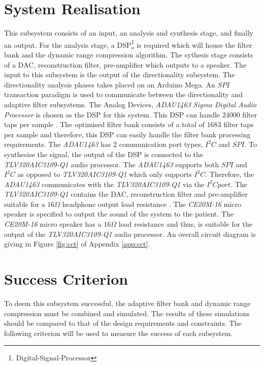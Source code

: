 \documentclass[11pt,onecolumn]{witseiepaper}
\begin{document}
\section{System Realisation}

\noindent This subsystem consists of an input, an analysis and synthesis stage, and finally an output. For the analysis stage, a DSP\footnote{Digital-Signal-Processor} is required which will house the filter bank and the dynamic range compression algorithm. The sythesis stage consists of a DAC, reconstruction filter, pre-amplifier which outputs to a speaker. The input to this subsystem is the output of the directionality subsystem. The directionality analysis phases takes placed on an Arduino Mega. An $SPI$ transaction paradigm is used to communicate between the directionality and adaptive filter subsystems. The Analog Devices, \textit{ADAU1463 Sigma Digital Audio Processor} is chosen as the DSP for this system. This DSP can handle $24000$ filter taps per sample \cite{dsp}. The optimised filter bank consists of a total of $1683$ filter taps per sample and therefore, this DSP can easily handle the filter bank processing requirements. The \textit{ADAU1463} has $2$ communication port types, $I^2C$ and $SPI$.  To synthesise the signal, the output of the DSP is connected to the \textit{TLV320AIC3109-Q1} audio processor. The \textit{ADAU1463} supports both $SPI$ and $I^2C$ as opposed to \textit{TLV320AIC3109-Q1} which only supports $I^2C$. Therefore, the \textit{ADAU1463} communicates with the \textit{TLV320AIC3109-Q1} via the $I^2C port$. The \textit{TLV320AIC3109-Q1} contains the DAC, reconstruction filter and pre-amplifier suitable for a $16 \Omega$ headphone output load resistance \cite{dac}. The \textit{CE20M-16} micro speaker is specified to output the sound of the system to the patient. The \textit{CE20M-16} micro speaker has a $16 \Omega$ load resistance \cite{speaker} and thus, is suitable for the output of the \textit{TLV320AIC3109-Q1} audio processor. An overall circuit diagram is giving in Figure \ref{fig:cct} of Appendix \ref{app:cct}.


\section{Success Criterion}

\noindent To deem this subsystem successful, the adaptive filter bank and dynamic range compression must be combined and simulated. The results of these simulations should be compared to that of the design requirements and constraints.  The following criterion will be used to measure the success of each subsystem.
\end{document}
